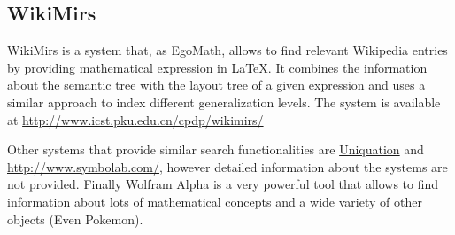 \subsection{WikiMirs}
WikiMirs\cite{wikimirs} is a system that, as EgoMath, allows to find relevant Wikipedia entries by providing mathematical expression in \LaTeX. It combines the information about the semantic tree with the layout tree of a given expression and uses a similar approach to index different generalization levels. The system is available at \url{http://www.icst.pku.edu.cn/cpdp/wikimirs/}

Other systems that provide similar search functionalities are \url{Uniquation} and \url{http://www.symbolab.com/}, however detailed information about the systems are not provided. Finally Wolfram Alpha\cite{wolframalpha} is a very powerful tool that allows to find information about lots of mathematical concepts and a wide variety of other objects (Even Pokemon).

